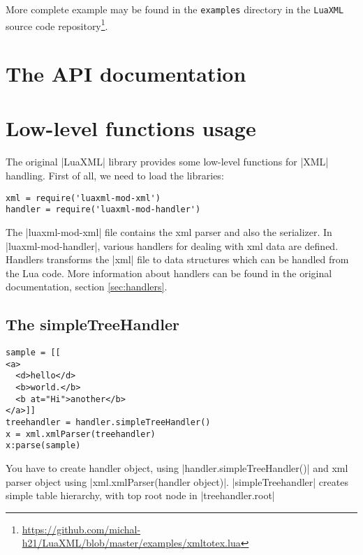 \documentclass{ltxdoc}
\begin{document}
More complete example may be found in the \texttt{examples} directory in the
\texttt{LuaXML} source code
repository\footnote{\url{https://github.com/michal-h21/LuaXML/blob/master/examples/xmltotex.lua}}.

\section{The API documentation}



\section{Low-level functions usage}



The original |LuaXML| library provides some low-level functions for |XML| handling.
First of all, we need to load the libraries:

\begin{verbatim}
xml = require('luaxml-mod-xml')
handler = require('luaxml-mod-handler')
\end{verbatim} 


The |luaxml-mod-xml| file contains the  xml parser and also the serializer. In
|luaxml-mod-handler|, various handlers for dealing with xml data are defined.
Handlers transforms the |xml| file to data structures which can be handled from
the Lua code. More information about handlers can be found in the original
documentation, section \ref{sec:handlers}.

\subsection{The simpleTreeHandler} 
\begin{verbatim}
sample = [[
<a>
  <d>hello</d>
  <b>world.</b>
  <b at="Hi">another</b>
</a>]]
treehandler = handler.simpleTreeHandler()
x = xml.xmlParser(treehandler)
x:parse(sample)
\end{verbatim} 

You have to create handler object, using |handler.simpleTreeHandler()| and xml
parser object using |xml.xmlParser(handler object)|. |simpleTreehandler|
creates simple table hierarchy, with top root node in |treehandler.root|
\end{document}
